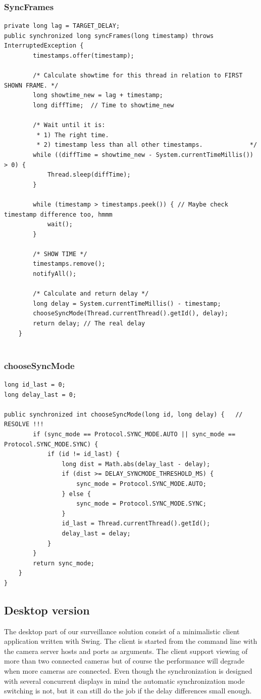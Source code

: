 \documentclass[8pt,titlepage]{article}
\begin{document}
\subsubsection{SyncFrames}
\begin{verbatim}
private long lag = TARGET_DELAY;
public synchronized long syncFrames(long timestamp) throws InterruptedException {
		timestamps.offer(timestamp);

		/* Calculate showtime for this thread in relation to FIRST SHOWN FRAME. */
		long showtime_new = lag + timestamp;				
		long diffTime;	// Time to showtime_new

		/* Wait until it is:
		 * 1) The right time.
		 * 2) timestamp less than all other timestamps.				*/				
		while ((diffTime = showtime_new - System.currentTimeMillis()) > 0) {
			Thread.sleep(diffTime);		
		} 

		while (timestamp > timestamps.peek()) { // Maybe check timestamp difference too, hmmm
			wait();
		}

		/* SHOW TIME */
		timestamps.remove();
		notifyAll();

		/* Calculate and return delay */
		long delay = System.currentTimeMillis() - timestamp;					
		chooseSyncMode(Thread.currentThread().getId(), delay);
		return delay; // The real delay
	}


\end{verbatim}
\subsubsection{chooseSyncMode}
\begin{verbatim}
long id_last = 0;
long delay_last = 0;	

public synchronized int chooseSyncMode(long id, long delay) {	// RESOLVE !!!		
		if (sync_mode == Protocol.SYNC_MODE.AUTO || sync_mode == Protocol.SYNC_MODE.SYNC) {
			if (id != id_last) {
				long dist = Math.abs(delay_last - delay);
				if (dist >= DELAY_SYNCMODE_THRESHOLD_MS) {
					sync_mode = Protocol.SYNC_MODE.AUTO;
				} else {
					sync_mode = Protocol.SYNC_MODE.SYNC;
				}
				id_last = Thread.currentThread().getId();
				delay_last = delay;		
			}
		}
		return sync_mode;
	}
}	
\end{verbatim}

\subsection{Desktop version}
The desktop part of our surveillance solution consist of a minimalistic client application written with Swing. The client is started from the command line with the camera server hosts and ports as arguments. The client support viewing of more than two connected cameras but of course the performance will degrade when more cameras are connected. Even though the synchronization is designed with several concurrent displays in mind the automatic synchronization mode switching is not, but it can still do the job if the delay differences small enough.
\end{document}
